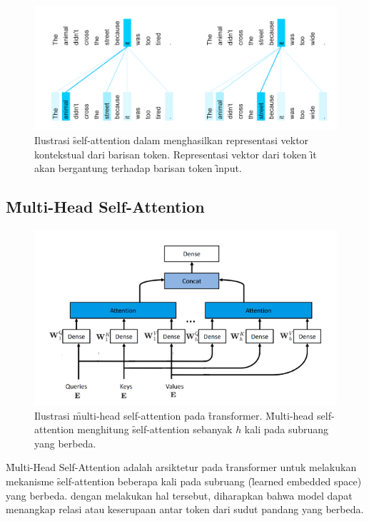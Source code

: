 	\begin{figure}
		\centering
		\includegraphics[width=1\textwidth]{assets/pics/self-attn-example.png}
		\caption{Ilustrasi \f{self-attention} dalam menghasilkan representasi vektor kontekstual dari barisan token. Representasi vektor dari token \f{it} akan bergantung terhadap barisan token \f{input}.}
		\label{fig:self-attention-example}
	\end{figure}
	
	\subsection{\f{Multi-Head Self-Attention}}

	\begin{figure}
		\centering
		\includegraphics[width=1\textwidth]{assets/pics/MHSA.png}
		\caption{Ilustrasi \f{multi-head self-attention} pada \f{transformer}. \f{Multi-head self-attention} menghitung \f{self-attention} sebanyak $h$ kali pada subruang yang berbeda.}
		\label{fig:multi-head-self-attention}
	\end{figure}

	\f{Multi-Head Self-Attention} adalah arsiktetur pada \f{transformer} untuk melakukan mekanisme \f{self-attention} beberapa kali pada subruang (\f{learned embedded space}) yang berbeda. dengan melakukan hal tersebut, diharapkan bahwa model dapat menangkap relasi atau keserupaan antar token dari sudut pandang yang berbeda. 

